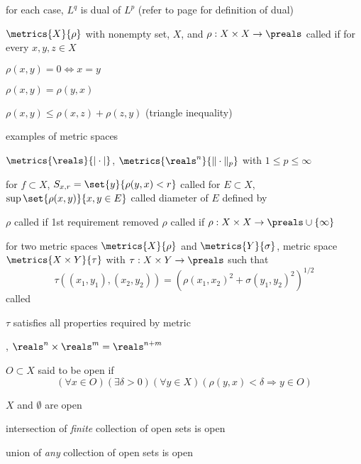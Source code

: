 \documentclass[17pt,landscape]{foils}
\begin{document}
{{	\vvitem for each case, $L^q$ is dual of $L^p$
		(refer to page \pageref{page:Dual-of-normed-spaces} for definition of dual)
\eit




\bit
	\item $\metrics{X}{\rho}$ with nonempty set, $X$, and  $\rho: X\times X\to\preals$ called 
		if for every $x,y,z \in X$
	\bit
		\item $\rho(x,y)=0 \Leftrightarrow x=y$
		\item $\rho(x,y)=\rho(y,x)$
		\item $\rho(x,y) \leq \rho(x,z) + \rho(z,y)$ (triangle inequality)
	\eit

	\vitem examples of metric spaces
	\bit
		\item $\metrics{\reals}{|\cdot|}$, $\metrics{\reals^n}{\|\cdot\|_p}$ with $1\leq p\leq \infty$
	\eit

	\vvitem for $f\subset X$, $S_{x,r} = \set{y}{\rho(y,x)<r}$ called 
	\vitem for $E\subset X$, $\sup\set{\rho(x,y)}{x,y \in E}$ called diameter of $E$ defined by

	\vvitem $\rho$ called  if 1st requirement removed
	\vitem $\rho$ called  if $\rho: X\times X \to\preals\cup\{\infty\}$
\eit



\bit
	\item for two metric spaces $\metrics{X}{\rho}$ and $\metrics{Y}{\sigma}$,
		metric space $\metrics{X\times Y}{\tau}$ with $\tau:X\times Y\to\preals$ such that
		\[
			\tau((x_1,y_1),(x_2,y_2)) = (\rho(x_1,x_2)^2 + \sigma(y_1,y_2)^2)^{1/2}
		\]
		called 

	\vitem $\tau$ satisfies all properties required by metric
	\bit
		\item \eg, $\reals^{n} \times \reals^{m} = \reals^{n+m}$
	\eit
\eit



\bit
	\item $O \subset X$ said to be open  if
	\[
		(\forall x\in O)(\exists \delta>0)(\forall y\in X)(\rho(y,x)<\delta \Rightarrow y\in O)
	\]
	\bit
		\item $X$ and $\emptyset$ are open
		\item intersection of \emph{finite} collection of open sets is open
		\item union of \emph{any} collection of open sets is open
	\eit
\eit


}}
\end{document}
